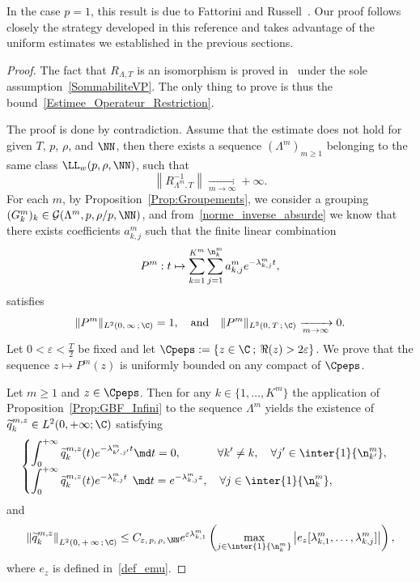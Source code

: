 In the case $p=1$, this result is due to Fattorini and Russell~\cite[Theorem~1.3]{FattoriniRussell74}. Our proof follows closely the strategy developed in this reference and takes advantage of the uniform estimates we established in the previous sections.



\begin{proof}
The fact that $R_{\Lambda,T}$ is an isomorphism is proved in~\cite{SchwartzThese} under the sole assumption~\eqref{SommabiliteVP}. The only thing to prove is thus the bound~\eqref{Estimee_Operateur_Restriction}.

The proof is done by contradiction. Assume that the estimate does not hold for given $T$, $p$, $\rho$, and $\NN$, then there exists a sequence $(\Lambda^m)_{m \geq 1}$ belonging to the same class $\LL_w(p,\rho,\NN)$, such that
\begin{equation}\label{norme_inverse_absurde}
\left\|R_{\Lambda^m,T}^{-1}\right\| \xrightarrow[m\to \infty]{} +\infty.
\end{equation}
For each $m$, by Proposition~\ref{Prop:Groupements}, we consider a grouping $(G^m_k)_k\in \mathcal{G}(\Lambda^m,p,\rho/p,\NN)$, and from~\eqref{norme_inverse_absurde} we know that there exists coefficients $a_{k,j}^m$ such that the finite linear combination
\[
P^m : t \mapsto \sum_{k=1}^{K^m} \sum_{j=1}^{\n_k^m} a_{k,j}^m e^{-\lambda^m_{k,j} t},
\]
satisfies
\[
\|P^m\|_{L^2(0,\,\infty\,;\,\C)} = 1,
\quad \text{and} \quad
\|P^m\|_{L^2(0,\,T\,;\,\C)} \xrightarrow[m\to \infty]{} 0.
\]
Let $0 < \varepsilon < \frac{T}{2}$ be fixed and let $\Cpeps := \{z \in \C \: ; \: \Re(z)>2\varepsilon\}$. We prove that the sequence $z\mapsto P^m(z)$ is uniformly bounded on any compact of $\Cpeps$.

Let $m \geq 1$ and $z \in \Cpeps$. Then for any $k \in \{1, \dots, K^m \}$ the application of Proposition~\ref{Prop:GBF_Infini} to the sequence $\Lambda^m$ yields the existence of $\widetilde{q}_k^{m,z}\in L^2(0,+\infty;\C)$ satisfying
\begin{equation}\label{equations_qkmz}
\begin{cases}
\displaystyle\int_0^{+\infty} \widetilde{q}_k^{m,z}(t) e^{-\lambda^m_{k',j'} t} \md t = 0, \mkern58mu \forall k' \neq k, \quad \forall j'\in \inter{1}{\n^m_{k'}},
\\
\displaystyle\int_0^{+\infty} \widetilde{q}_k^{m,z}(t) e^{-\lambda^m_{k,j} t} \;\,\md t = e^{-\lambda^m_{k,j} z}, \quad \forall j \in \inter{1}{\n^m_k},
\end{cases}
\end{equation}
and
\[
\left\| \widetilde{q}_k^{m,z} \right\|_{L^2(0,\,+\,\infty\,;\,\C)} \leq C_{\varepsilon,\,p,\,\rho,\,\NN} e^{ \varepsilon \lambda^m_{k,1}} \left(\max_{j\in \inter{1}{\n^m_k}} \left| e_z[\lambda^m_{k,1},\dotsc,\lambda^m_{k,j}] \right| \right),
\]
where $e_z$ is defined in~\eqref{def_emu}.



\end{proof}
